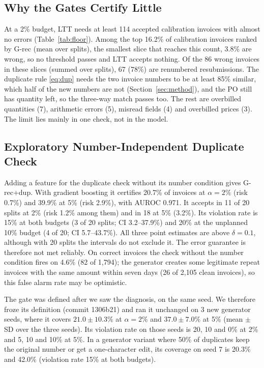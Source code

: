 \documentclass[conference]{IEEEtran}
\newcommand{\sysP}{\textsf{G-rec}}         %
\newcommand{\sysPdup}{\textsf{G-rec+dup}}  %
\begin{document}
\subsection{Why the Gates Certify Little}\label{sec:why}
At a 2\% budget, LTT needs at least 114 accepted calibration invoices with
almost no errors (Table~\ref{tab:floor}). Among the top 16.2\% of calibration
invoices ranked by \sysP{} (mean over splits), the smallest slice that reaches this count,
3.8\% are wrong, so no threshold passes and LTT accepts nothing. Of the
86 wrong invoices in these slices (summed over splits), 67 (78\%) are renumbered resubmissions.
The duplicate rule
\eqref{eq:dup} needs the two invoice numbers to be at least 85\% similar, which
half of the new numbers are not (Section~\ref{sec:method}), and the PO still has
quantity left, so the three-way match passes too. The rest are overbilled
quantities (7), arithmetic errors (5), misread fields (4) and
overbilled prices (3). The limit lies mainly in one check, not in the model.

\subsection{Exploratory Number-Independent Duplicate Check}\label{sec:posthoc}
Adding a feature for the duplicate check without its number condition gives
\sysPdup. With gradient boosting it certifies 20.7\% of invoices at
$\alpha=2\%$ (risk 0.7\%) and 39.9\% at 5\% (risk 2.9\%), with AUROC 0.971. It accepts in 11 of 20 splits at 2\% (risk 1.2\% among them) and in 18 at 5\% (3.2\%). Its
violation rate is 15\% at both budgets (3 of 20 splits; CI 3.2--37.9\%) and 20\% at
the unplanned 10\% budget (4 of 20; CI 5.7--43.7\%). All three point estimates are above
$\delta=0.1$, although with 20 splits the intervals do not exclude it. The error
guarantee is therefore not met reliably. On correct invoices the check without the
number condition fires on 4.6\% (82 of 1,794); the generator creates some
legitimate repeat invoices with the same amount within seven days (26 of 2,105 clean invoices), so this false
alarm rate may be optimistic.

The gate was defined after we saw the diagnosis, on the same seed. We therefore
froze its definition (commit 1306b21) and ran it unchanged on 3 new
generator seeds, where it covers $21.0\pm10.3\%$ at $\alpha=2\%$ and
$37.0\pm7.0\%$ at 5\% (mean $\pm$ SD over the three seeds). Its violation rate on those seeds
is 20, 10 and 0\% at 2\% and 5, 10 and 10\% at 5\%. In a generator variant where 50\% of
duplicates keep the original number or get a one-character edit, its coverage on seed 7 is
20.3\% and 42.0\% (violation rate 15\% at both budgets).
\end{document}
